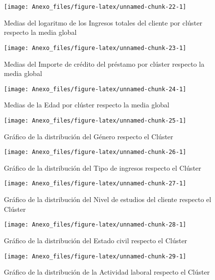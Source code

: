 \documentclass[
]{article}
\begin{document}
\begin{figure}
\texttt{[image: Anexo\_files/figure-latex/unnamed-chunk-22-1]} \caption{Medias del logaritmo de los Ingresos totales del cliente por clúster respecto la media global}\label{fig:unnamed-chunk-22}
\end{figure}

\begin{figure}
\texttt{[image: Anexo\_files/figure-latex/unnamed-chunk-23-1]} \caption{Medias del Importe de crédito del préstamo por clúster respecto la media global}\label{fig:unnamed-chunk-23}
\end{figure}

\begin{figure}
\texttt{[image: Anexo\_files/figure-latex/unnamed-chunk-24-1]} \caption{Medias de la Edad por clúster respecto la media global}\label{fig:unnamed-chunk-24}
\end{figure}

\begin{figure}
\texttt{[image: Anexo\_files/figure-latex/unnamed-chunk-25-1]} \caption{Gráfico de la distribución del Género respecto el Clúster}\label{fig:unnamed-chunk-25}
\end{figure}

\begin{figure}
\texttt{[image: Anexo\_files/figure-latex/unnamed-chunk-26-1]} \caption{Gráfico de la distribución del Tipo de ingresos respecto el Clúster}\label{fig:unnamed-chunk-26}
\end{figure}

\begin{figure}
\texttt{[image: Anexo\_files/figure-latex/unnamed-chunk-27-1]} \caption{Gráfico de la distribución del Nivel de estudios del cliente respecto el Clúster}\label{fig:unnamed-chunk-27}
\end{figure}

\begin{figure}
\texttt{[image: Anexo\_files/figure-latex/unnamed-chunk-28-1]} \caption{Gráfico de la distribución del Estado civil respecto el Clúster}\label{fig:unnamed-chunk-28}
\end{figure}

\begin{figure}
\texttt{[image: Anexo\_files/figure-latex/unnamed-chunk-29-1]} \caption{Gráfico de la distribución de la Actividad laboral respecto el Clúster}\label{fig:unnamed-chunk-29}
\end{figure}
\end{document}
